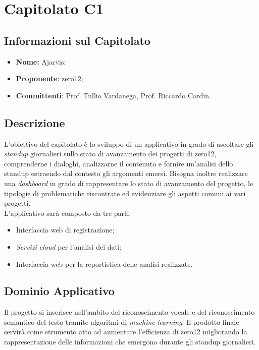 \section{Capitolato C1}
\subsection{Informazioni sul Capitolato}
\begin{itemize}
	\item \textbf{Nome:} Ajarvis;
	\item \textbf{Proponente}: zero12;
	\item \textbf{Committenti}: Prof. Tullio Vardanega, Prof. Riccardo Cardin.
\end{itemize}

\subsection{Descrizione}
L'obiettivo del capitolato è lo sviluppo di un applicativo in grado di ascoltare gli \textit{standup} giornalieri sullo stato di avanzamento dei progetti di zero12, comprenderne i dialoghi, analizzarne il contenuto e fornire un'analisi dello standup estraendo dal contesto gli argomenti emersi. Bisogna inoltre realizzare una \textit{dashboard} in grado di rappresentare lo stato di avanzamento del progetto, le tipologie di problematiche riscontrate ed evidenziare gli aspetti comuni ai vari progetti.
\\
L'applicativo sarà composto da tre parti:
\begin{itemize}
	\item Interfaccia web di registrazione;
	\item \textit{Servizi cloud} per l'analisi dei dati;
	\item Interfaccia web per la reportistica delle analisi realizzate.
\end{itemize}

\subsection{Dominio Applicativo}
Il progetto si inserisce nell'ambito del riconoscimento vocale e del riconoscimento semantico del testo tramite algoritmi di \textit{machine learning}. Il prodotto finale servirà come strumento atto ad aumentare l'efficienza di zero12 migliorando la rappresentazione delle informazioni che emergono durante gli standup giornalieri.

